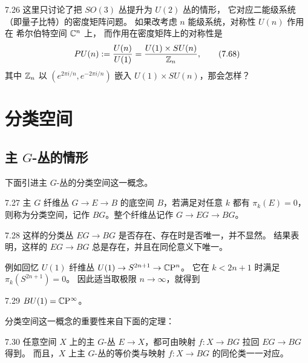 \begin{question}{7.26}
这里只讨论了把 $SO(3)$ 丛提升为 $U(2)$ 丛的情形，
它对应二能级系统（即量子比特）的密度矩阵问题。
如果改考虑 $n$ 能级系统，对称性 $U(n)$ 作用在 希尔伯特空间 $\mathbb{C}^n$ 上，
而作用在密度矩阵上的对称性是
\begin{equation}
PU(n):=\frac{U(n)}{U(1)}=\frac{U(1)\times SU(n)}{\mathbb{Z}_n},
\tag{7.68}
\end{equation}
其中 $\mathbb{Z}_n$ 以 $(e^{2\pi i/n},e^{-2\pi i/n})$ 嵌入 $U(1)\times SU(n)$，那会怎样？
\end{question}


\section{分类空间}

\subsection{主 $G$-丛的情形}

下面引进主 $G$-丛的分类空间这一概念。

\begin{definition}{7.27}
主 $G$ 纤维丛 $G\to E\to B$ 的底空间 $B$，若满足对任意 $k$ 都有 $\pi_k(E)=0$，
则称为分类空间，记作 $BG$。整个纤维丛记作 $G\to EG\to BG$。
\end{definition}

\begin{remark}{7.28}
这样的分类丛 $EG\to BG$ 是否存在、存在时是否唯一，并不显然。
结果表明，这样的 $EG\to BG$ 总是存在，并且在同伦意义下唯一。
\end{remark}

例如回忆 $U(1)$ 纤维丛 $U(1)\to S^{2n+1}\to\mathbb{C}\mathrm{P}^n$。
它在 $k<2n+1$ 时满足 $\pi_k(S^{2n+1})=0$。
因此适当取极限 $n\to\infty$，就得到

\begin{example}{7.29}
$BU(1)=\mathbb{C}\mathrm{P}^\infty$。
\end{example}

分类空间这一概念的重要性来自下面的定理：

\begin{theorem}{7.30}
任意空间 $X$ 上的主 $G$-丛 $E\to X$，都可由映射 $f:X\to BG$ 拉回 $EG\to BG$ 得到。
而且，$X$ 上主 $G$-丛的等价类与映射 $f:X\to BG$ 的同伦类一一对应。
\end{theorem}

